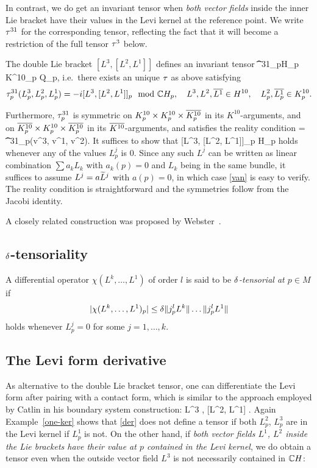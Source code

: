 \documentclass[12pt]{amsart}
\begin{document}
In contrast, we do get an invariant tensor when {\em both vector fields}
inside the inner Lie bracket have their values in the Levi kernel
at the reference point.
We write $\tau^{31}$ for the corresponding tensor, 
reflecting the fact that it will become a restriction 
of the full tensor $\tau^3$ below.


\bl{}
	The double Lie bracket $[L^3, [L^2, L^1]]$ defines
	an invariant tensor
	\beq
		\t^{31}_p\colon \C H_p \times K^{10}_p \times {} \to \C Q_p,
	\eeq
	i.e.\ there exists an unique $\tau$ as above satisfying
	$$
		\tau^{31}_p(L^3_p, L^2_p, L^1_p) 
		= -i  [L^3, [L^2, L^1]]_p \mod {{\mathbb{C}}} H_p
		,
		\quad L^3, L^2, \overline{L^1} \in H^{10},
		\quad L^2_p, \overline{L^1_p}\in K^{10}_p.
	$$
	
	Furthermore, $\tau^{31}_p$ is symmetric on $K^{10}_p\times K^{10}_p\times \overline{K^{10}_p}$ 
	in its $K^{10}$-arguments, 
	and on $\overline{K^{10}_p}\times K^{10}_p\times \overline{K^{10}_p}$ in its $\overline{K^{10}}$-arguments,  
	and satisfies the reality condition
\beq{}
	 = \t^{31}_p(\1v^3, \1v^1, \1v^2).
\eeq
\el
\bpf
It suffices to show that
\beq{}
	[L^3, [L^2, L^1]]_p \in \C H_p
\eeq
holds
whenever any of the values $L^j_p$ is $0$.
Since any such $L^j$ can be written as linear combination
$\sum a_k L_k$ with $a_k(p)=0$ and $L_k$ being in the same bundle,
it suffices to assume $L^j = a \widetilde{L}^j$ with $a(p)=0$,
in which case \eqref{van} is easy to verify.
The reality condition is straightforward and the symmetries follow
from the Jacobi identity.
\epf

A closely related construction 
was proposed by Webster~\cite{W}.



\subsection{$\delta$-tensoriality}

\bd
A differential operator $\chi(L^k, \ldots, L^1)$ of order $l$
 is said to be {\em $\delta$-tensorial at $p\in M$}  if 
$$
	|\chi(L^k, \ldots,  L^1)_p| \le \delta \|j^l_pL^k\| \ldots  \|j^l_pL^1\|
$$
holds whenever $L^j_p=0$ for some $j=1,\ldots, k$.
\ed



\subsection{The Levi form derivative}
As alternative to the double Lie bracket tensor, one can 
differentiate the Levi form after pairing with a contact form,
which is similar to the approach employed by Catlin 
in his boundary system construction:
\beq{}
	L^3 \la \th, [L^2, L^1] \ra.
\eeq
Again Example~\ref{one-ker} shows that \eqref{der}
does not define a tensor if both $L^2_p$, $L^3_p$
are in the Levi kernel if $L^1_p$ is not.
On the other hand, if {\em both vector fields
$L^1$, $L^2$ inside the Lie brackets
have their value at $p$ contained in the Levi kernel}, we do obtain a tensor
even when the outside vector field $L^3$ is not necessarily contained in ${\mathbb{C}} H$:
\end{document}
